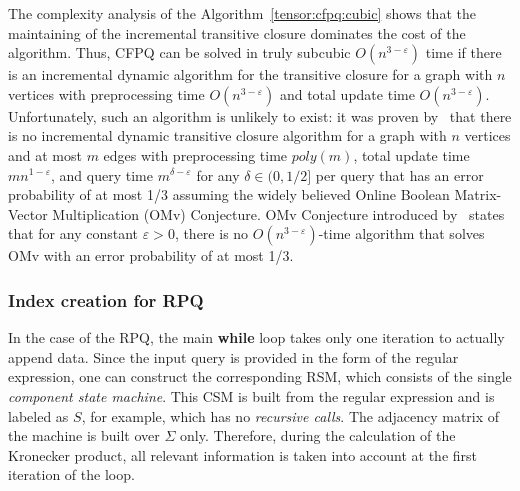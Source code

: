 The complexity analysis of the Algorithm~\ref{tensor:cfpq:cubic} shows that the maintaining of the incremental transitive closure dominates the cost of the algorithm. Thus, CFPQ can be solved in truly subcubic $O(n^{3-\varepsilon})$ time if there is an incremental dynamic algorithm for the transitive closure for a graph with $n$ vertices with preprocessing time $O(n^{3-\varepsilon})$ and total update time $O(n^{3-\varepsilon})$. Unfortunately, such an algorithm is unlikely to exist: it was proven by~\cite{10.1145/2746539.2746609} that there is no incremental dynamic transitive closure algorithm for a graph with $n$ vertices and at most $m$ edges with preprocessing time $poly(m)$, total update time $mn^{1-\varepsilon}$, and query time $m^{\delta-\varepsilon}$ for any $\delta \in (0, 1/2]$ per query that has an error probability of at most 1/3 assuming the widely believed Online Boolean Matrix-Vector Multiplication (OMv) Conjecture. OMv Conjecture introduced by~\cite{10.1145/2746539.2746609} states that for any constant $ \varepsilon>0$, there is no $O(n^{3-\varepsilon})$-time algorithm that solves OMv with an error probability of at most 1/3.



\subsubsection{Index creation for RPQ}
In the case of the RPQ, the main \textbf{while} loop takes only one iteration to actually append data.
Since the input query is provided in the form of the regular expression, one can construct the corresponding RSM, which consists of the single \textit{component state machine}.
This CSM is built from the regular expression and is labeled as $S$, for example, which has no \textit{recursive calls}.
The adjacency matrix of the machine is built over $\Sigma$ only.
Therefore, during the calculation of the Kronecker product, all relevant information is taken into account at the first iteration of the loop.